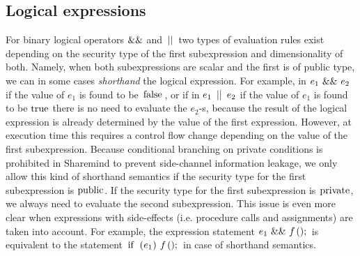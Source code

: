 \documentclass[a4paper, 10pt, draft]{report}
\newcommand{\mycode}[1]{\ensuremath{\mbox{\lstinline{#1}}}}
\begin{document}
\subsection{Logical expressions}\label{sec:semantics:expr:logic}

For binary logical operators \mycode{&&} and \mycode{||} two types of
evaluation rules exist depending on the security type of the first
subexpression and dimensionality of both. Namely, when both subexpressions are
scalar and the first is of public type, we can in some cases \textit{shorthand}
the logical expression. For example, in $e_1\ \mycode{&&}\ e_2$ if the value of
$e_1$ is found to be \mycode{false}, or if in $e_1\ \mycode{||}\ e_2$ if the
value of $e_1$ is found to be \mycode{true} there is no need to evaluate the
$e_2$-s, because the result of the logical expression is already determined by
the value of the first expression. However, at execution time this requires a
control flow change depending on the value of the first subexpression. Because
conditional branching on private conditions is prohibited in Sharemind to
prevent side-channel information leakage, we only allow this kind of shorthand
semantics if the security type for the first subexpression is \mycode{public}.
If the security type for the first subexpression is \mycode{private}, we always
need to evaluate the second subexpression.  This issue is even more clear when
expressions with side-effects (i.e. procedure calls and assignments) are taken
into account.  For example, the expression statement $e_1\ \mycode{&&}\
f\mycode{();}$ is equivalent to the statement $\mycode{if (}e_1\mycode{)}\
f\mycode{();}$ in case of shorthand semantics.
\end{document}
